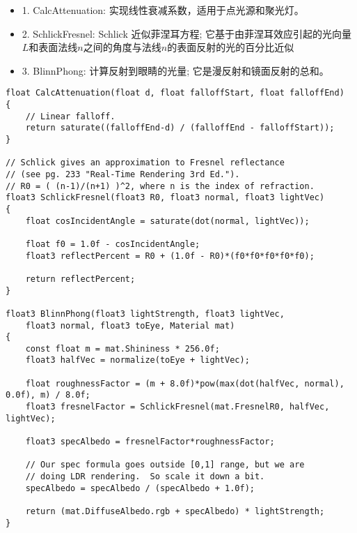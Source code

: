\begin{itemize}
  \item 1. CalcAttenuation: 实现线性衰减系数，适用于点光源和聚光灯。
  \item 2. SchlickFresnel: Schlick 近似菲涅耳方程; 它基于由菲涅耳效应引起的光向量$L$和表面法线$n$之间的角度与法线$n$的表面反射的光的百分比近似
  \item 3. BlinnPhong: 计算反射到眼睛的光量; 它是漫反射和镜面反射的总和。
\end{itemize}

\begin{lstlisting}
float CalcAttenuation(float d, float falloffStart, float falloffEnd)
{
    // Linear falloff.
    return saturate((falloffEnd-d) / (falloffEnd - falloffStart));
}

// Schlick gives an approximation to Fresnel reflectance 
// (see pg. 233 "Real-Time Rendering 3rd Ed.").
// R0 = ( (n-1)/(n+1) )^2, where n is the index of refraction.
float3 SchlickFresnel(float3 R0, float3 normal, float3 lightVec)
{
    float cosIncidentAngle = saturate(dot(normal, lightVec));

    float f0 = 1.0f - cosIncidentAngle;
    float3 reflectPercent = R0 + (1.0f - R0)*(f0*f0*f0*f0*f0);

    return reflectPercent;
}

float3 BlinnPhong(float3 lightStrength, float3 lightVec, 
    float3 normal, float3 toEye, Material mat)
{
    const float m = mat.Shininess * 256.0f;
    float3 halfVec = normalize(toEye + lightVec);

    float roughnessFactor = (m + 8.0f)*pow(max(dot(halfVec, normal), 0.0f), m) / 8.0f;
    float3 fresnelFactor = SchlickFresnel(mat.FresnelR0, halfVec, lightVec);

    float3 specAlbedo = fresnelFactor*roughnessFactor;

    // Our spec formula goes outside [0,1] range, but we are 
    // doing LDR rendering.  So scale it down a bit.
    specAlbedo = specAlbedo / (specAlbedo + 1.0f);

    return (mat.DiffuseAlbedo.rgb + specAlbedo) * lightStrength;
}
\end{lstlisting}

